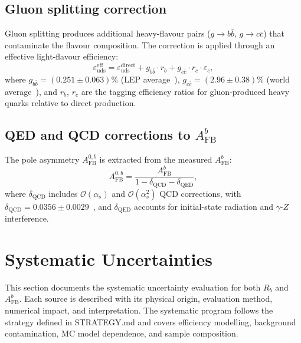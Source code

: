 \documentclass[11pt,a4paper]{article}
\begin{document}
\subsection{Gluon splitting correction}
\label{sec:gluon_splitting}

Gluon splitting produces additional heavy-flavour pairs ($g \to b\bar{b}$,
$g \to c\bar{c}$) that contaminate the flavour composition. The correction is
applied through an effective light-flavour efficiency:
\begin{equation}
\varepsilon_\mathrm{uds}^\mathrm{eff} = \varepsilon_\mathrm{uds}^\mathrm{direct}
+ g_{b\bar{b}} \cdot r_b + g_{c\bar{c}} \cdot r_c \cdot \varepsilon_c,
\label{eq:gluon_correction}
\end{equation}
where $g_{b\bar{b}} = (0.251 \pm 0.063)\%$ (LEP average~\cite{LEP:HF:2001}),
$g_{c\bar{c}} = (2.96 \pm 0.38)\%$ (world average~\cite{LEP:gcc}), and $r_b$, $r_c$
are the tagging efficiency ratios for gluon-produced heavy quarks relative to direct
production.

\subsection{QED and QCD corrections to $A_\mathrm{FB}^b$}
\label{sec:qcd_corrections}

The pole asymmetry $A_\mathrm{FB}^{0,b}$ is extracted from the measured $A_\mathrm{FB}^b$:
\begin{equation}
A_\mathrm{FB}^{0,b} = \frac{A_\mathrm{FB}^b}{1 - \delta_\mathrm{QCD} - \delta_\mathrm{QED}},
\label{eq:pole_correction}
\end{equation}
where $\delta_\mathrm{QCD}$ includes $\mathcal{O}(\alpha_s)$ and $\mathcal{O}(\alpha_s^2)$
QCD corrections, with $\delta_\mathrm{QCD} = 0.0356 \pm 0.0029$~\cite{LEP:EWWG:2005},
and $\delta_\mathrm{QED}$ accounts for initial-state radiation and $\gamma$-$Z$ interference.

\FloatBarrier
{}
\section{Systematic Uncertainties}
\label{sec:systematics}

This section documents the systematic uncertainty evaluation for both $R_b$ and
$A_\mathrm{FB}^b$. Each source is described with its physical origin, evaluation
method, numerical impact, and interpretation. The systematic program follows the
strategy defined in STRATEGY.md and covers efficiency modelling, background
contamination, MC model dependence, and sample composition.
\end{document}
